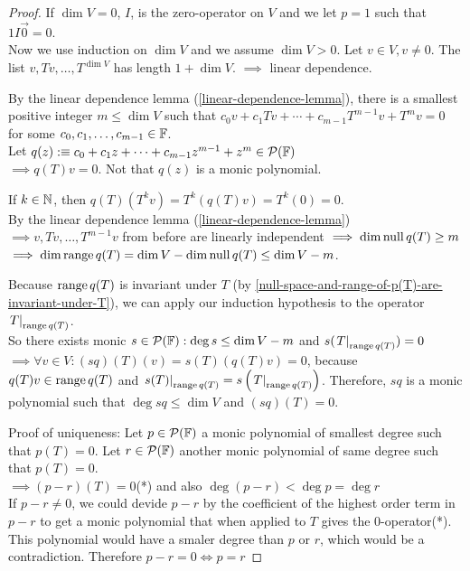 \begin{proof}
    If $\dim V=0$, $I$, is the zero-operator on $V$ and we let $p=1$ such that $1I\vec0=0$. \\
    Now we use induction on $\dim V$ and we assume $\dim V > 0$. Let $v\in V, v \neq 0$. The list $v, Tv, \dots, T^{\dim V}$ has length $1+\dim V.$
    $\implies$ linear dependence.

    By the linear dependence lemma (\ref{linear-dependence-lemma}), there is a smallest positive integer $m\leq \dim V$ such that $c_0 v + c_1 Tv + \cdots + c_{m-1} T^{m-1} v + T^m v = 0$ for some $c_0, c_1, \dots, c_{m-1} \in \mathbb{F}$. \\

    Let $q(z) :\equiv c_0 + c_1z + \cdots + c_{m-1} z^{m-1} +z^{m} \in \mathcal{P} (\mathbb{F})$ \\
    $\implies q(T) v=0$. Not that $q(z)$ is a monic polynomial.

    If $k \in \mathbb{N}$, then $q(T)(T^kv)=T^k(q(T)v) =T^k (0) =0$.\\
    By the linear dependence lemma (\ref{linear-dependence-lemma}) $\implies v, Tv, \dots, T^{m-1}v$ from before are linearly independent $\implies \dim \operatorname{null} q(T) \geq m$ \\
    $\implies \dim \operatorname{range} q(T) = \dim V - \dim \operatorname{null} q(T) \leq \dim V - m$.

    Because $\operatorname{range} q(T)$ is invariant under $T$ (by \ref{null-space-and-range-of-p(T)-are-invariant-under-T}), we can apply our induction hypothesis to the operator $\left.T\right|_{\operatorname{range} q(T)}$. \\
    So there exists monic $s \in \mathcal{P} (\mathbb{F}): \deg s \leq \dim V - m$ and $s(\left.T\right|_{\operatorname{range} q(T)})=0$ \\
    $\implies \forall v \in V: (sq)(T)(v) = s(T) (q(T)v) = 0$, because $q(T)v \in \operatorname{range} q(T)$ and $\left.s(T)\right|_{\operatorname{range} q(T)}=s\left( \left.T\right|_{\operatorname{range} q(T)} \right )$.
    Therefore, $sq$ is a monic polynomial such that $\deg sq \leq \dim V$ and $(sq)(T)=0$.

    Proof of uniqueness: Let $p\in \mathcal{P} (\mathbb{F})$ a monic polynomial of smallest degree such that $p(T)=0$. Let $r\in \mathcal{P} ( \mathbb{F})$ another monic polynomial of same degree such that $p(T)=0$. \\
    $\implies (p-r) (T) = 0$(*) and also $\deg (p-r) < \deg p = \deg r$ \\
    If $p-r \neq 0$, we could devide $p-r$ by the coefficient of the highest order term in $p-r$ to get a monic polynomial that when applied to $T$ gives the $0$-operator(*). This polynomial would have a smaler degree than $p$ or $r$, which would be a contradiction. Therefore $p-r=0 \iff p = r$
\end{proof}

